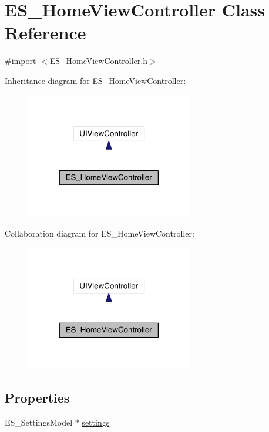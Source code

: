 \hypertarget{interface_e_s___home_view_controller}{\section{E\+S\+\_\+\+Home\+View\+Controller Class Reference}
\label{interface_e_s___home_view_controller}
}


{\ttfamily \#import $<$E\+S\+\_\+\+Home\+View\+Controller.\+h$>$}



Inheritance diagram for E\+S\+\_\+\+Home\+View\+Controller\+:\nopagebreak
\begin{figure}[H]
\begin{center}
\leavevmode
\includegraphics[width=206pt]{d6/ddc/interface_e_s___home_view_controller__inherit__graph}
\end{center}
\end{figure}


Collaboration diagram for E\+S\+\_\+\+Home\+View\+Controller\+:\nopagebreak
\begin{figure}[H]
\begin{center}
\leavevmode
\includegraphics[width=206pt]{dc/dbc/interface_e_s___home_view_controller__coll__graph}
\end{center}
\end{figure}
\subsection*{Properties}
\begin{DoxyCompactItemize}
\item 
E\+S\+\_\+\+Settings\+Model $\ast$ \hyperlink{interface_e_s___home_view_controller_a8254a560bea73c4cacb5ae75edd9a4fa}{settings}
\end{DoxyCompactItemize}


